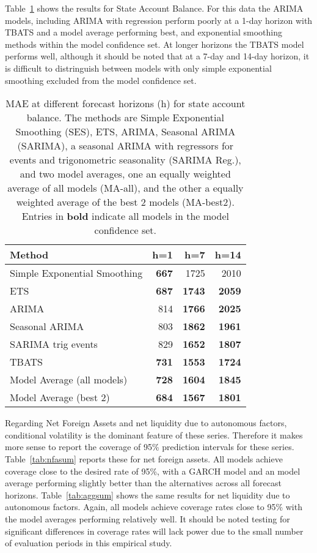 Table~\ref{tab:sabsum} shows the results for State Account Balance. For this data the ARIMA models, including ARIMA with regression perform poorly at a 1-day horizon with TBATS and a model average performing best, and exponential smoothing methods within the model confidence set. At longer horizons the TBATS model performs well, although it should be noted that at a 7-day and 14-day horizon, it is difficult to distringuish between models with only simple exponential smoothing excluded from the model confidence set.

\begin{table}[!ht]
\centering
\begin{tabular}{lrrr}
  \hline
Method & h=1 & h=7 & h=14 \\ 
  \hline
Simple Exponential Smoothing & \textbf{667} & 1725 & 2010 \\ 
  ETS & \textbf{687} & \textbf{1743} & \textbf{2059} \\ 
  ARIMA & 814 & \textbf{1766} & \textbf{2025} \\ 
  Seasonal ARIMA & 803 & \textbf{1862} & \textbf{1961} \\ 
  SARIMA trig events & 829 & \textbf{1652} & \textbf{1807} \\ 
  TBATS & \textbf{731} & \textbf{1553} & \textbf{1724 }\\ 
  Model Average (all models) & \textbf{728} & \textbf{1604} & \textbf{1845} \\ 
  Model Average (best 2) & \textbf{684} & \textbf{1567} & \textbf{1801} \\ 
   \hline
\end{tabular}
\caption{MAE at different forecast horizons (h) for state account balance. The methods are Simple Exponential Smoothing (SES), ETS, ARIMA, Seasonal ARIMA (SARIMA), a seasonal ARIMA with regressors for events and trigonometric seasonality (SARIMA Reg.), and two model averages, one an equally weighted average of all models (MA-all), and the other a equally weighted average of the best 2 models (MA-best2). Entries in \textbf{bold} indicate all models in the model confidence set.} 
\label{tab:sabsum}
\end{table}

Regarding Net Foreign Assets and net liquidity due to autonomous factors, conditional volatility is the dominant feature of these series. Therefore it makes more sense to report the coverage of 95\% prediction intervals for these series. Table~\ref{tab:nfasum} reports these for net foreign assets. All models achieve coverage close to the desired rate of 95\%, with a GARCH model and an model average performing slightly better than the alternatives across all forecast horizons. Table~\ref{tab:aggsum} shows the same results for net liquidity due to autonomous factors. Again, all models achieve coverage rates close to 95\% with the model averages performing relatively well. It should be noted testing for significant differences in coverage rates will lack power due to the small number of evaluation periods in this empirical study.

